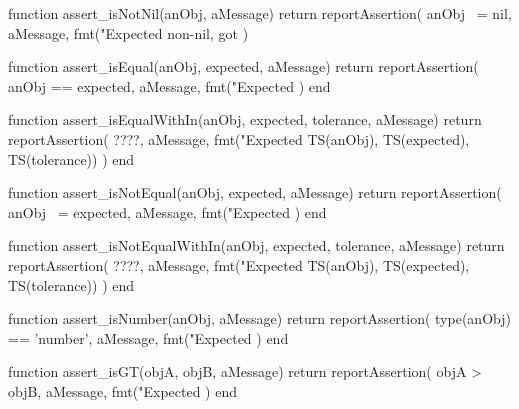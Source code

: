 \startLuaCode
function assert_isNotNil(anObj, aMessage)
  return reportAssertion(
    anObj ~= nil,
    aMessage,
    fmt("Expected non-nil, got %
  )
\stopLuaCode

\stopTestSuite

\startTestSuite[title=assert_isEqual]

\startLuaCode
function assert_isEqual(anObj, expected, aMessage)
  return reportAssertion(
    anObj == expected,
    aMessage,
    fmt("Expected %
  )
end
\stopLuaCode

\stopTestSuite

\startTestSuite[title=assert_isEqualWithIn]

\startLuaCode
function assert_isEqualWithIn(anObj, expected, tolerance, aMessage)
  return reportAssertion(
    ????,
    aMessage,
    fmt("Expected %
      TS(anObj), TS(expected), TS(tolerance))
  )
end
\stopLuaCode

\stopTestSuite

\startTestSuite[title=assert_isNotEqual]

\startLuaCode
function assert_isNotEqual(anObj, expected, aMessage)
  return reportAssertion(
    anObj ~= expected,
    aMessage,
    fmt("Expected %
  )
end
\stopLuaCode

\stopTestSuite

\startTestSuite[title=assert_isNotEqualWithIn]
\startLuaCode
function assert_isNotEqualWithIn(anObj, expected, tolerance, aMessage)
  return reportAssertion(
    ????,
    aMessage,
    fmt("Expected %
      TS(anObj), TS(expected), TS(tolerance))
  )
end
\stopLuaCode

\stopTestSuite

\startTestSuite[title=assert_isNumber]

\startLuaCode
function assert_isNumber(anObj, aMessage)
  return reportAssertion(
    type(anObj) == 'number',
    aMessage,
    fmt("Expected %
  )
end
\stopLuaCode

\stopTestSuite

\startTestSuite[title=assert_isGT]

\startLuaCode
function assert_isGT(objA, objB, aMessage)
  return reportAssertion(
    objA > objB,
    aMessage,
    fmt("Expected %
  )
end
\stopLuaCode

\stopTestSuite

